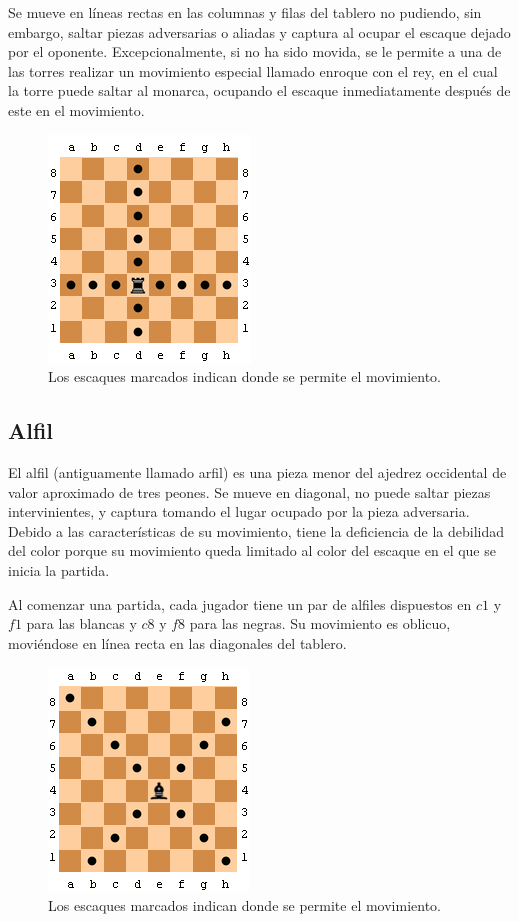 Se mueve en líneas rectas en las columnas y filas del tablero no pudiendo, sin embargo, saltar piezas adversarias o aliadas y captura al ocupar el escaque dejado por el oponente. Excepcionalmente, si no ha sido movida, se le permite a una de las torres realizar un movimiento especial llamado enroque con el rey, en el cual la torre puede saltar al monarca, ocupando el escaque inmediatamente después de este en el movimiento. 

\begin{figure}[!h]
	\centering 
	\includegraphics[scale=0.75]{img/movtorre}
	\caption{Los escaques marcados indican donde se permite el movimiento.}
	\label{contexto:figuratorre}
\end{figure}

\subsection{Alfil}

El alfil (antiguamente llamado arfil) es una pieza menor del ajedrez occidental de valor aproximado de tres peones. Se mueve en diagonal, no puede saltar piezas intervinientes, y captura tomando el lugar ocupado por la pieza adversaria. Debido a las características de su movimiento, tiene la deficiencia de la debilidad del color porque su movimiento queda limitado al color del escaque en el que se inicia la partida.

Al comenzar una partida, cada jugador tiene un par de alfiles dispuestos en $c1$ y $f1$ para las blancas y $c8$ y $f8$ para las negras. Su movimiento es oblicuo, moviéndose en línea recta en las diagonales del tablero.

  \begin{figure}[!h]
  	\centering 
  	\includegraphics[scale=0.75]{img/movalfil}
  	\caption{Los escaques marcados indican donde se permite el movimiento.}
  	\label{contexto:figuraalfil}
  \end{figure}

